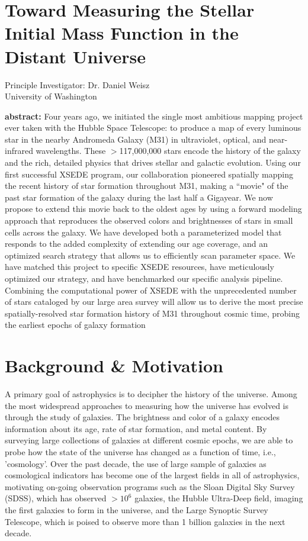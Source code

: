 \documentclass[11pt,preprint]{aastex}
\begin{document}
\section*{\Large Toward Measuring the Stellar Initial Mass Function in the Distant Universe}


\begin{center}
Principle Investigator: Dr. Daniel Weisz\\
University of Washington
\end{center}

{\small
{\bf abstract:}
Four years ago, we initiated the single most ambitious mapping project
ever taken with the Hubble Space Telescope: to produce a map of every
luminous star in the nearby Andromeda Galaxy (M31) in ultraviolet,
optical, and near-infrared wavelengths. These $>$117,000,000 stars
encode the history of the galaxy and the rich, detailed physics that
drives stellar and galactic evolution. Using our first successful XSEDE
program, our collaboration pioneered spatially mapping the recent
history of star formation throughout M31, making a ``movie" of the past
star formation of the galaxy during the last half a Gigayear.  We now
propose to extend this movie back to the oldest ages by using a
forward modeling approach that reproduces the observed colors and
brightnesses of stars in small cells across the galaxy. We have
developed both a parameterized model that responds to the added
complexity of extending our age coverage, and an optimized search
strategy that allows us to efficiently scan parameter space.  We have
matched this project to specific XSEDE resources, have meticulously
optimized our strategy, and have benchmarked our specific analysis
pipeline.  Combining the computational power of XSEDE with the
unprecedented number of stars cataloged by our large area survey will
allow us to derive the most precise spatially-resolved star formation
history of M31 throughout cosmic time, probing the earliest epochs of
galaxy formation }


\section{Background \& Motivation}
\label{sec:overview}

A primary goal of astrophysics is to decipher the history of the universe.  Among the most widespread approaches to measuring how the universe has evolved is through the study of galaxies.  The brightness and color of a galaxy encodes information about its age, rate of star formation, and metal content.  By surveying large collections of galaxies at different cosmic epochs, we are able to probe how the state of the universe has changed as a function of time, i.e., 'cosmology'.  Over the past decade, the use of large sample of galaxies as cosmological indicators has become one of the largest fields in all of astrophysics, motivating on-going observation programs such as the Sloan Digital Sky Survey (SDSS), which has observed $>10^6$ galaxies, the Hubble Ultra-Deep field, imaging the first galaxies to form in the universe, and the Large Synoptic Survey Telescope, which is poised to observe more than 1 billion galaxies in the next decade.
\end{document}
